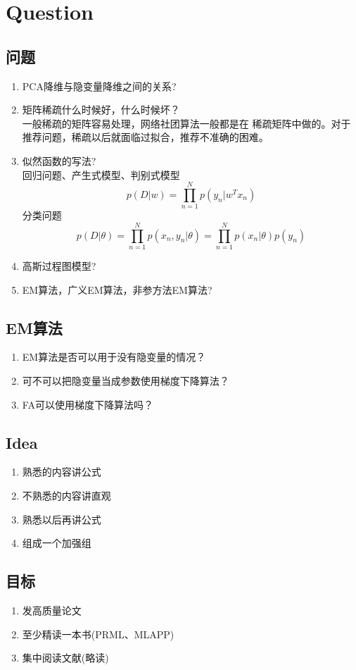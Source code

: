 \chapter{Question}
\section{问题}

\begin{enumerate}
\item PCA降维与隐变量降维之间的关系?\\
\item 矩阵稀疏什么时候好，什么时候坏？\\
一般稀疏的矩阵容易处理，网络社团算法一般都是在
稀疏矩阵中做的。对于推荐问题，稀疏以后就面临过拟合，推荐不准确的困难。
\item 似然函数的写法?\\
回归问题、产生式模型、判别式模型
\begin{equation}
p(D|w) = \prod^N_{n=1} p(y_n|w^Tx_n)
\end{equation}
分类问题
\begin{equation}
p(D|\theta) = \prod_{n=1}^N p(x_n, y_n|\theta)
= \prod_{n=1}^Np(x_n|\theta)p(y_n)
\end{equation}
\item 高斯过程图模型?\\
\item EM算法，广义EM算法，非参方法EM算法?\\
\end{enumerate}

\section{EM算法}
\begin{enumerate}
\item EM算法是否可以用于没有隐变量的情况？
\item 可不可以把隐变量当成参数使用梯度下降算法？
\item FA可以使用梯度下降算法吗？
\end{enumerate}
\section{Idea}
\begin{enumerate}
\item 熟悉的内容讲公式
\item 不熟悉的内容讲直观
\item 熟悉以后再讲公式
\item 组成一个加强组 
\end{enumerate}

\section{目标}
\begin{enumerate}
\item 发高质量论文
\item 至少精读一本书(PRML、MLAPP)
\item 集中阅读文献(略读)
\end{enumerate}

